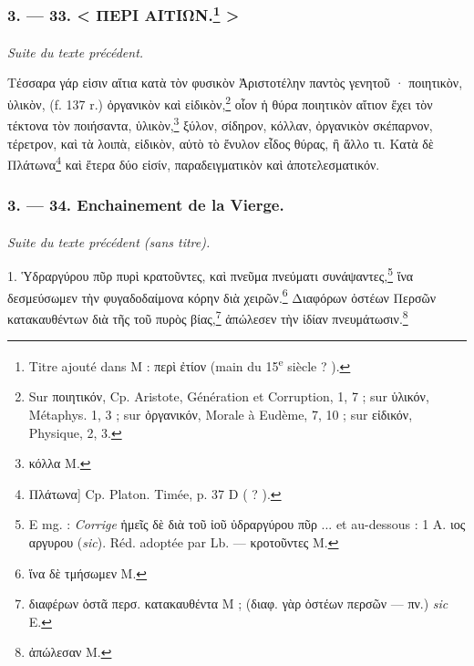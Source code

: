 \documentclass[a4paper, 11pt, oneside, polutonikogreek, french]{article}
\begin{document}
\bigskip
\centerline{\EightStarTaper}
\centerline{\EightStarTaper\EightStarTaper}
\bigskip

\subsubsection[3. --- 33. < ΠΕΡΙ ΑΙΤΙΩΝ. >]{3. --- 33. < ΠΕΡΙ ΑΙΤΙΩΝ.\footnote{Titre ajouté dans M : περὶ ἐτίον (main du 15\textsuperscript{e} siècle ? ).} >}
\paragraph{}
\emph{Suite du texte précédent.}

\bigskip

Τέσσαρα γάρ εἰσιν αἴτια κατὰ τὸν φυσικὸν Ἀριστοτέλην παντὸς γενητοῦ · ποιητικὸν, ὑλικὸν, (f. 137 r.) ὀργανικὸν καὶ εἰδικὸν,\footnote{Sur ποιητικόν, Cp. Aristote, Génération et Corruption, 1, 7 ; sur ὑλικόν, Métaphys. 1, 3 ; sur ὀργανικόν, Morale à Eudème, 7, 10 ; sur εἰδικόν, Physique, 2, 3.} οἷον ἡ θύρα ποιητικὸν αἴτιον ἔχει τὸν τέκτονα τὸν ποιήσαντα, ὑλικὸν,\footnote{κόλλα M.} ξύλον, σίδηρον, κόλλαν, ὀργανικὸν σκέπαρνον, τέρετρον, καὶ τὰ λοιπὰ, εἰδικὸν, αὐτὸ τὸ ἔνυλον εἶδος θύρας, ἢ ἄλλο τι. Κατὰ δὲ Πλάτωνα\footnote{Πλάτωνα] Cp. Platon. Timée, p. 37 D ( ? ).} καὶ ἕτερα δύο εἰσίν, παραδειγματικὸν καὶ ἀποτελεσματικόν.

\bigskip
\centerline{\EightStarTaper}
\centerline{\EightStarTaper\EightStarTaper}
\bigskip

\subsubsection{3. --- 34. Enchainement de la Vierge.}
\paragraph{}
\emph{Suite du texte précédent (sans titre).}

\bigskip

1. Ὑδραργύρου πῦρ πυρὶ κρατοῦντες, καὶ πνεῦμα πνεύματι συνάψαντες,\footnote{E mg. : \emph{Corrige} ἡμεῖς δὲ διὰ τοῦ ἰοῦ ὐδραργύρου πῦρ ... et au-dessous : 1 A. ιος αργυρου (\emph{sic}). Réd. adoptée par Lb. --- κροτοῦντες M.} ἵνα δεσμεύσωμεν τὴν φυγαδοδαίμονα κόρην διὰ χειρῶν.\footnote{ἵνα δὲ τμήσωμεν M.} Διαφόρων ὀστέων Περσῶν κατακαυθέντων διὰ τῆς τοῦ πυρὸς βίας,\footnote{διαφέρων ὁστᾶ περσ. κατακαυθέντα M ; (διαφ. γὰρ ὀστέων περσῶν --- πν.) \emph{sic} E.} ἀπώλεσεν τὴν ἰδίαν πνευμάτωσιν.\footnote{ἀπώλεσαν M.}
\end{document}
